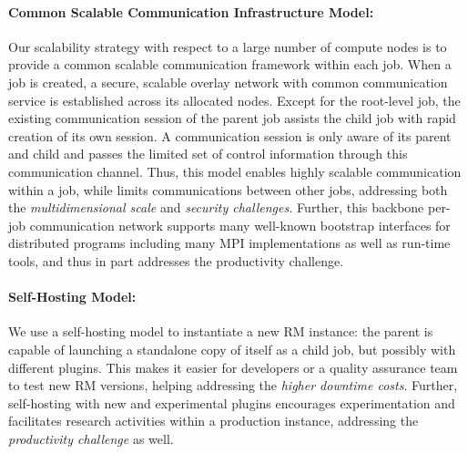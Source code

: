 \documentclass{article}
\begin{document}
\paragraph{Common Scalable Communication Infrastructure Model:}
Our scalability strategy with respect to a large number of compute nodes 
is to provide a common scalable communication framework within each
job. When a job is created, a secure, scalable overlay network with common
communication service is established across its allocated nodes.
Except for the root-level job, the existing communication session of the
parent job assists the child job with rapid creation of its own session.
A communication session is only aware of its parent and child and passes
the limited set of control information through this communication channel.
Thus, this model enables highly scalable communication within a job, 
while limits communications between other jobs, addressing both the 
{\sl multidimensional scale} and {\sl security challenges.} 
Further, this backbone per-job communication network supports 
many well-known bootstrap interfaces for distributed programs including
many MPI implementations as well as run-time tools, and thus in part
addresses the {productivity challenge}. 


\paragraph{Self-Hosting Model:}
We use a self-hosting model to instantiate a new RM instance: the parent
is capable of launching a standalone copy of itself as a child job, but possibly
with different plugins. 
This makes it easier for developers or a quality assurance team to test new RM versions,
helping addressing the {\sl higher downtime costs}. 
Further, self-hosting with new and experimental plugins 
encourages experimentation and facilitates research activities 
within a production instance, addressing the {\sl productivity challenge}
as well.
\end{document}
